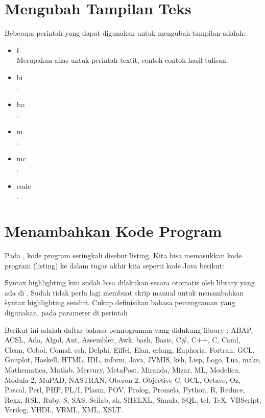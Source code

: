 \section{Mengubah Tampilan Teks}
Beberapa perintah yang dapat digunakan untuk mengubah tampilan adalah: 
\begin{itemize}
	\item \bslash{}f \\
	Merupakan alias untuk perintah \bslash textit, contoh 
	\f{contoh hasil tulisan}.
	\item \bslash{}bi \\
	.
	\item \bslash{}bo \\
	.
	\item \bslash{}m \\
	.
	\item \bslash{}mc \\
	.
	\item \bslash{}code \\ 
	.
\end{itemize}


\section{Menambahkan Kode Program}
Pada \latex, kode program seringkali disebut \f{listing}. Kita bisa memasukkan kode program (\f{listing}) ke dalam tugas akhir kita seperti kode Java berikut:


\f{Syntax highlighting} kini sudah bisa dilakukan secara otomatis oleh \f{library} yang ada di \latex.
Sudah tidak perlu lagi membuat skrip manual untuk menambahkan \f{syntax highlighting} sendiri.
Cukup definisikan bahasa pemrograman yang digunakan, pada parameter  di perintah .

Berikut ini adalah daftar bahasa pemrograman yang didukung \f{library} : ABAP, ACSL, Ada, Algol, Ant, Assembler, Awk, bash, Basic, C\#, C++, C, Caml, Clean, Cobol, Comal, csh, Delphi, Eiffel, Elan, erlang, Euphoria, Fortran, GCL, Gnuplot, Haskell, HTML, IDL, inform, Java, JVMIS, ksh, Lisp, Logo, Lua, make, Mathematica, Matlab, Mercury, MetaPost, Miranda, Mizar, ML, Modelica, Modula-2, MuPAD, NASTRAN, Oberon-2, Objective C, OCL, Octave, Oz, Pascal, Perl, PHP, PL/I, Plasm, POV, Prolog, Promela, Python, R, Reduce, Rexx, RSL, Ruby, S, SAS, Scilab, sh, SHELXL, Simula, SQL, tcl, TeX, VBScript, Verilog, VHDL, VRML, XML, XSLT.\cite{latex:source_code_listings}

